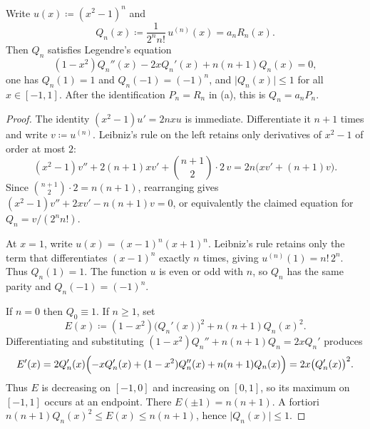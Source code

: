 \documentclass[11pt,a4paper]{article}
\begin{document}
\begin{lemma}
\label{lem:std-legendre-bound}
Write \(u(x)\coloneqq(x^{2}-1)^{n}\) and
\[
Q_{n}(x)
\coloneqq
\frac{1}{2^{n}n!}\,u^{(n)}(x)
=
a_{n}R_{n}(x).
\]
Then \(Q_{n}\) satisfies Legendre's equation
\[
(1-x^{2})Q_{n}''(x)-2x Q_{n}'(x)+n(n+1)Q_{n}(x)=0,
\]
one has \(Q_{n}(1)=1\) and \(Q_{n}(-1)=(-1)^{n}\), and \(\lvert Q_{n}(x)\rvert\le 1\) for all \(x\in[-1,1]\). After the identification \(P_{n}=R_{n}\) in (a), this is \(Q_{n}=a_{n}P_{n}\).
\end{lemma}

\begin{proof}
The identity \((x^{2}-1)u'=2nxu\) is immediate. Differentiate it \(n+1\) times and write \(v\coloneqq u^{(n)}\). Leibniz's rule on the left retains only derivatives of \(x^{2}-1\) of order at most \(2\):
\[
(x^{2}-1)v''+2(n+1)xv'+\binom{n+1}{2}\cdot 2\,v
=
2n\bigl(xv'+(n+1)v\bigr).
\]
Since \(\binom{n+1}{2}\cdot 2=n(n+1)\), rearranging gives \((x^{2}-1)v''+2xv'-n(n+1)v=0\), or equivalently the claimed equation for \(Q_{n}=v/(2^{n}n!)\).

At \(x=1\), write \(u(x)=(x-1)^{n}(x+1)^{n}\). Leibniz's rule retains only the term that differentiates \((x-1)^{n}\) exactly \(n\) times, giving \(u^{(n)}(1)=n!\,2^{n}\). Thus \(Q_{n}(1)=1\). The function \(u\) is even or odd with \(n\), so \(Q_{n}\) has the same parity and \(Q_{n}(-1)=(-1)^{n}\).

If \(n=0\) then \(Q_{0}\equiv 1\). If \(n\ge 1\), set
\[
E(x)
\coloneqq
(1-x^{2})\bigl(Q_{n}'(x)\bigr)^{2}+n(n+1)Q_{n}(x)^{2}.
\]
Differentiating and substituting \((1-x^{2})Q_{n}''+n(n+1)Q_{n}=2x Q_{n}'\) produces
\[
E'(x)
=
2Q_{n}'(x)\Bigl(-x Q_{n}'(x)+(1-x^{2})Q_{n}''(x)+n(n+1)Q_{n}(x)\Bigr)
=
2x\bigl(Q_{n}'(x)\bigr)^{2}.
\]
Thus \(E\) is decreasing on \([-1,0]\) and increasing on \([0,1]\), so its maximum on \([-1,1]\) occurs at an endpoint. There \(E(\pm 1)=n(n+1)\). A fortiori \(n(n+1)Q_{n}(x)^{2}\le E(x)\le n(n+1)\), hence \(\lvert Q_{n}(x)\rvert\le 1\).
\end{proof}
\end{document}
